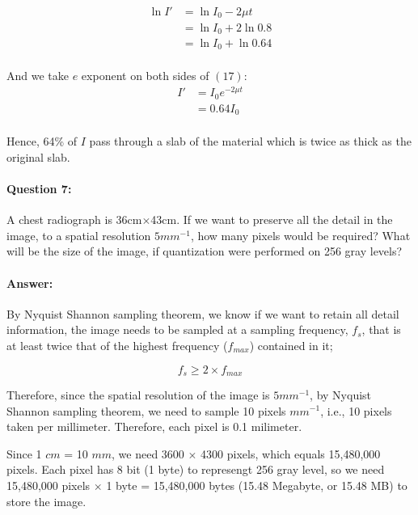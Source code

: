 \documentclass[12pt, letter]{article}
\begin{document}
\begin{equation}  \label{eq1}
\begin{split}
    \ln I' & = \ln I_0 - 2\mu t \\
          & = \ln I_0 + 2\ln0.8 \\
          & = \ln I_0 + \ln0.64 \\
\end{split}
\end{equation}

And we take $e$ exponent on both sides of $(17)$:
\begin{equation}  \label{eq1}
\begin{split}
    I' & = I_0e^{-2\mu t} \\
       & = 0.64I_0 \\
\end{split}
\end{equation}

Hence, 64\% of $I$ pass through a slab of the material which is twice as thick as the original slab.

\paragraph{Question 7: }A chest radiograph is 36cm$\times$43cm. If we want to preserve all the detail in the image, to a spatial resolution $5mm^{-1}$, how many pixels would be required? What will be the size of the image, if quantization were performed on 256 gray levels?

\paragraph{Answer: } By Nyquist Shannon sampling theorem, we know if we want to retain all detail information, the image needs to be sampled at a sampling frequency, $f_s$, that is at least twice that of the highest frequency ($f_{max}$) contained in it;

\begin{equation}
    f_s \geqslant 2 \times f_{max}
\end{equation}

Therefore, since the spatial resolution of the image is $5mm^{-1}$, by Nyquist Shannon sampling theorem, we need to sample 10 pixels $mm^{-1}$, i.e., 10 pixels taken per millimeter. Therefore, each pixel is 0.1 milimeter. 

Since 1 $cm$ = 10 $mm$, we need 3600 $\times$ 4300 pixels, which equals 15,480,000 pixels. Each pixel has 8 bit (1 byte) to represengt 256 gray level, so we need 15,480,000 pixels $\times$ 1 byte = 15,480,000 bytes (15.48 Megabyte, or 15.48 MB) to store the image. 
\end{document}
